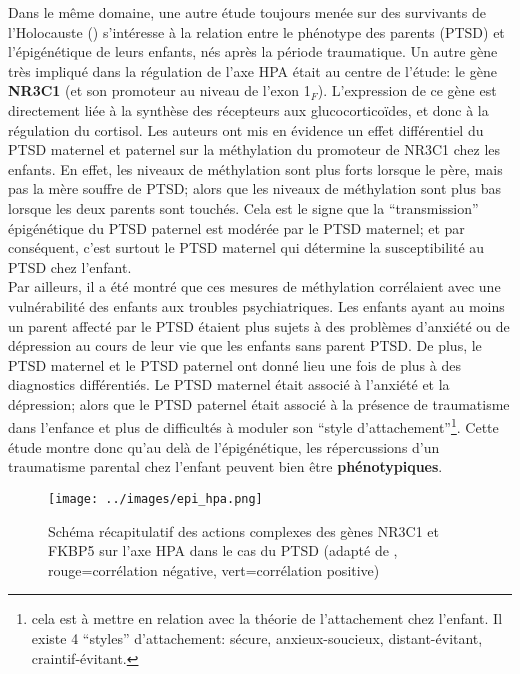 \documentclass[french]{article}
\begin{document}
				Dans le même domaine, une autre étude toujours menée sur des survivants de l'Holocauste (\cite{yehuda2014}) s'intéresse à la relation entre le phénotype des parents (PTSD) et l'épigénétique de leurs enfants, nés après la période traumatique. Un autre gène très impliqué dans la régulation de l'axe HPA était au centre de l'étude: le gène \textbf{NR3C1} (et son promoteur au niveau de l'exon 1$_F$). L'expression de ce gène est directement liée à la synthèse des récepteurs aux glucocorticoïdes, et donc à la régulation du cortisol. Les auteurs ont mis en évidence un effet différentiel du PTSD maternel et paternel sur la méthylation du promoteur de NR3C1 chez les enfants. En effet, les niveaux de méthylation sont plus forts lorsque le père, mais pas la mère souffre de PTSD; alors que les niveaux de méthylation sont plus bas lorsque les deux parents sont touchés. Cela est le signe que la ``transmission'' épigénétique du PTSD paternel est modérée par le PTSD maternel; et par conséquent, c'est surtout le PTSD maternel qui détermine la susceptibilité au PTSD chez l'enfant.\\
				Par ailleurs, il a été montré que ces mesures de méthylation corrélaient avec une vulnérabilité des enfants aux troubles psychiatriques. Les enfants ayant au moins un parent affecté par le PTSD étaient plus sujets à des problèmes d'anxiété ou de dépression au cours de leur vie que les enfants sans parent PTSD. De plus, le PTSD maternel et le PTSD paternel ont donné lieu une fois de plus à des diagnostics différentiés. Le PTSD maternel était associé à l'anxiété et la dépression; alors que le PTSD paternel était associé à la présence de traumatisme dans l'enfance et plus de difficultés à moduler son ``style d'attachement''\footnote{cela est à mettre en relation avec la théorie de l'attachement chez l'enfant. Il existe 4 ``styles'' d'attachement: sécure, anxieux-soucieux, distant-évitant, craintif-évitant.}. Cette étude montre donc qu'au delà de l'épigénétique, les répercussions d'un traumatisme parental chez l'enfant peuvent bien être \textbf{phénotypiques}.
				\begin{figure}[H]
					\centering
					\texttt{[image: ../images/epi\_hpa.png]}
					\caption{Schéma récapitulatif des actions complexes des gènes NR3C1 et FKBP5 sur l'axe HPA dans le cas du PTSD (adapté de \cite{yehuda2013}, rouge=corrélation négative, vert=corrélation positive)}
				\end{figure}
\end{document}
